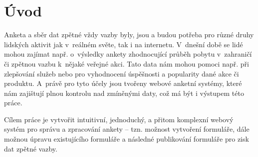 \chapter{Úvod}

Anketa a sběr dat zpětné vždy vazby byly, jsou a budou potřeba pro různé druhy lidských aktivit jak v~reálném světe, tak i na internetu. V~dnešní době se lidé mohou zajímat např. o~výsledky ankety zhodnocující průběh pobytu v~zahraničí či zpětnou vazbu k~nějaké veřejné akci. Tato data nám mohou pomoci např. při zlepšování služeb nebo pro vyhodnocení úspěšnosti a popularity dané akce či produktu. A~právě pro tyto účely jsou tvořeny webové anketní systémy, které nám zajištují plnou kontrolu nad zmíněnými daty, což má být i výstupem této práce.

Cílem práce je vytvořit intuitivní, jednoduchý, a přitom komplexní webový systém pro správu a zpracování ankety – tzn. možnost vytvoření formuláře, dále možnou úpravu existujícího formuláře a následné publikování formuláře pro zisk dat zpětné vazby.
